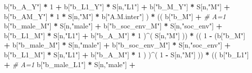 \documentclass[
]{book}
\newenvironment{Shaded}{\begin{snugshade}}{\end{snugshade}}
\newcommand{\CommentTok}[1]{\textcolor[rgb]{0.56,0.35,0.01}{\textit{#1}}}
\newcommand{\DecValTok}[1]{\textcolor[rgb]{0.00,0.00,0.81}{#1}}
\newcommand{\NormalTok}[1]{#1}
\newcommand{\SpecialCharTok}[1]{\textcolor[rgb]{0.81,0.36,0.00}{\textbf{#1}}}
\newcommand{\StringTok}[1]{\textcolor[rgb]{0.31,0.60,0.02}{#1}}
\begin{document}
\begin{Shaded}
\begin{Highlighting}[]
\NormalTok{                             b[}\StringTok{"b\_A\_Y"}\NormalTok{] }\SpecialCharTok{*} \DecValTok{1} \SpecialCharTok{+} 
\NormalTok{                             b[}\StringTok{"b\_L1\_Y"}\NormalTok{] }\SpecialCharTok{*}\NormalTok{ S[n,}\StringTok{"L1"}\NormalTok{] }\SpecialCharTok{+}
\NormalTok{                             b[}\StringTok{"b\_M\_Y"}\NormalTok{] }\SpecialCharTok{*}\NormalTok{ S[n,}\StringTok{"M"}\NormalTok{] }\SpecialCharTok{+}
\NormalTok{                             b[}\StringTok{"b\_AM\_Y"}\NormalTok{] }\SpecialCharTok{*} \DecValTok{1} \SpecialCharTok{*}\NormalTok{ S[n,}\StringTok{"M"}\NormalTok{] }\SpecialCharTok{*}\NormalTok{ b[}\StringTok{"A.M.inter"}\NormalTok{] ) }\SpecialCharTok{*}
\NormalTok{      (( b[}\StringTok{"b\_M"}\NormalTok{] }\SpecialCharTok{+}                                                             \CommentTok{\# A\textquotesingle{}=1}
\NormalTok{           b[}\StringTok{"b\_male\_M"}\NormalTok{] }\SpecialCharTok{*}\NormalTok{ S[n,}\StringTok{"male"}\NormalTok{] }\SpecialCharTok{+} 
\NormalTok{           b[}\StringTok{"b\_soc\_env\_M"}\NormalTok{] }\SpecialCharTok{*}\NormalTok{ S[n,}\StringTok{"soc\_env"}\NormalTok{] }\SpecialCharTok{+} 
\NormalTok{           b[}\StringTok{"b\_L1\_M"}\NormalTok{] }\SpecialCharTok{*}\NormalTok{ S[n,}\StringTok{"L1"}\NormalTok{] }\SpecialCharTok{+}
\NormalTok{           b[}\StringTok{"b\_A\_M"}\NormalTok{] }\SpecialCharTok{*} \DecValTok{1}\NormalTok{ )}\SpecialCharTok{\^{}}\NormalTok{( S[n,}\StringTok{"M"}\NormalTok{] )) }\SpecialCharTok{*}
\NormalTok{      (( }\DecValTok{1} \SpecialCharTok{{-}}\NormalTok{ (b[}\StringTok{"b\_M"}\NormalTok{] }\SpecialCharTok{+} 
\NormalTok{                b[}\StringTok{"b\_male\_M"}\NormalTok{] }\SpecialCharTok{*}\NormalTok{ S[n,}\StringTok{"male"}\NormalTok{] }\SpecialCharTok{+} 
\NormalTok{                b[}\StringTok{"b\_soc\_env\_M"}\NormalTok{] }\SpecialCharTok{*}\NormalTok{ S[n,}\StringTok{"soc\_env"}\NormalTok{] }\SpecialCharTok{+} 
\NormalTok{                b[}\StringTok{"b\_L1\_M"}\NormalTok{] }\SpecialCharTok{*}\NormalTok{ S[n,}\StringTok{"L1"}\NormalTok{] }\SpecialCharTok{+}
\NormalTok{                b[}\StringTok{"b\_A\_M"}\NormalTok{] }\SpecialCharTok{*} \DecValTok{1}\NormalTok{ ) )}\SpecialCharTok{\^{}}\NormalTok{( }\DecValTok{1} \SpecialCharTok{{-}}\NormalTok{ S[n,}\StringTok{"M"}\NormalTok{] )) }\SpecialCharTok{*}
\NormalTok{      (( b[}\StringTok{"b\_L1"}\NormalTok{] }\SpecialCharTok{+}                                                            \CommentTok{\# A=1}
\NormalTok{           b[}\StringTok{"b\_male\_L1"}\NormalTok{] }\SpecialCharTok{*}\NormalTok{ S[n,}\StringTok{"male"}\NormalTok{] }\SpecialCharTok{+}  

\end{Highlighting}
\end{Shaded}
\end{document}
